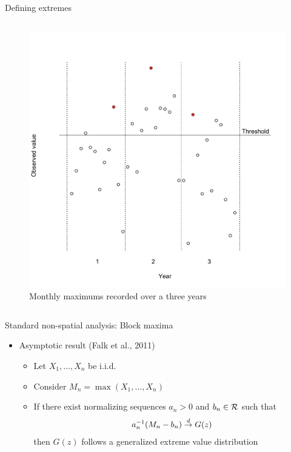 \documentclass{beamer}
\begin{document}
\begin{frame}{Defining extremes}
\begin{columns}[c]
  \begin{figure}
    \includegraphics[width=1\linewidth, trim=0 0.5in 0 1in]{./plots/define_extreme.pdf}
    \caption{Monthly maximums recorded over a three years}
    \end{figure}
\end{columns}
\end{frame}

\begin{frame}{Standard non-spatial analysis: Block maxima}
  \begin{itemize} \setlength{\itemsep}{0.5em}
    \item Asymptotic result (Falk et al., 2011)
    \begin{itemize}
      \item Let $X_1, \ldots, X_n$ be i.i.d.
      \item Consider $M_n = \max(X_1, \ldots, X_n)$
      \item If there exist normalizing sequences $a_n > 0$ and $b_n \in {\cal R}$ such that
      \begin{align*}
        a_n^{-1} (M_n - b_n) \stackrel{d}{\rightarrow} G(z)
      \end{align*}
      then $G(z)$ follows a generalized extreme value distribution
    \end{itemize}
  \end{itemize}
\end{frame}
\end{document}
